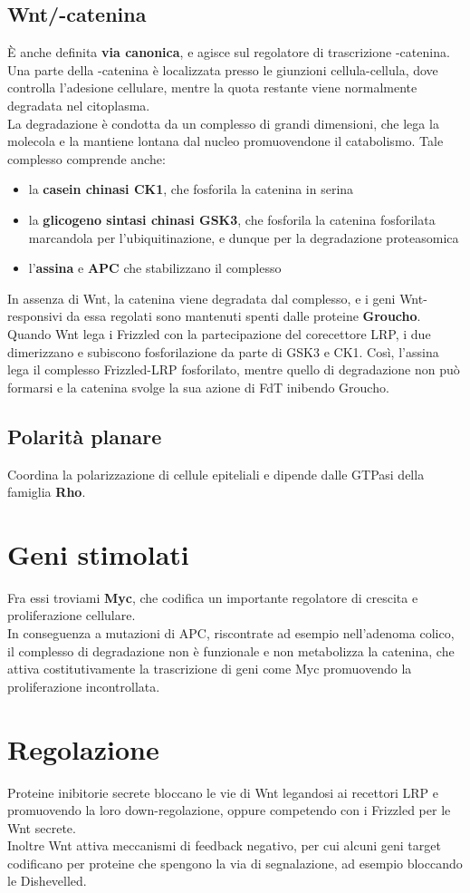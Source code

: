 \documentclass[a4paper, 12pt]{article}
\begin{document}
\subsection{Wnt/\textbeta-catenina}
È anche definita \textbf{via canonica}, e agisce sul regolatore di trascrizione \textbeta-catenina.\\
Una parte della \textbeta-catenina è localizzata presso le giunzioni cellula-cellula, dove controlla l'adesione cellulare, mentre la quota restante viene normalmente degradata nel citoplasma.\\
La degradazione è condotta da un complesso di grandi dimensioni, che lega la molecola e la mantiene lontana dal nucleo promuovendone il catabolismo. Tale complesso comprende anche:
\begin{itemize}
  \item la \textbf{casein chinasi CK1}, che fosforila la catenina in serina
  \item la \textbf{glicogeno sintasi chinasi GSK3}, che fosforila la catenina fosforilata marcandola per l'ubiquitinazione, e dunque per la degradazione proteasomica
  \item l'\textbf{assina} e \textbf{APC} che stabilizzano il complesso
\end{itemize}
In assenza di Wnt, la catenina viene degradata dal complesso, e i geni Wnt-responsivi da essa regolati sono mantenuti spenti dalle proteine \textbf{Groucho}.\\
Quando Wnt lega i Frizzled con la partecipazione del corecettore LRP, i due dimerizzano e subiscono fosforilazione da parte di GSK3 e CK1. Così, l'assina lega il complesso Frizzled-LRP fosforilato, mentre quello di degradazione non può formarsi e la catenina svolge la sua azione di FdT inibendo Groucho.

\subsection{Polarità planare}
Coordina la polarizzazione di cellule epiteliali e dipende dalle GTPasi della famiglia \textbf{Rho}.

\section{Geni stimolati}
Fra essi troviami \textbf{Myc}, che codifica un importante regolatore di crescita e proliferazione cellulare.\\
In conseguenza a mutazioni di APC, riscontrate ad esempio nell'adenoma colico, il complesso di degradazione non è funzionale e non metabolizza la catenina, che attiva costitutivamente la trascrizione di geni come Myc promuovendo la proliferazione incontrollata.

\section{Regolazione}
Proteine inibitorie secrete bloccano le vie di Wnt legandosi ai recettori LRP e promuovendo la loro down-regolazione, oppure competendo con i Frizzled per le Wnt secrete.\\
Inoltre Wnt attiva meccanismi di feedback negativo, per cui alcuni geni target codificano per proteine che spengono la via di segnalazione, ad esempio bloccando le Dishevelled.
\end{document}
